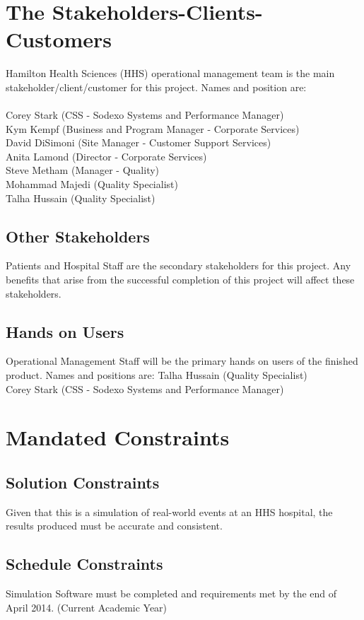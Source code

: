 \documentclass[paper=letter, fontsize=10pt]{scrartcl}
\numberwithin{equation}{section}		%
\numberwithin{figure}{section}			%
\numberwithin{table}{section}				%
\begin{document}
\section{The Stakeholders-Clients-Customers}
Hamilton Health Sciences (HHS) operational management team is the main stakeholder/client/customer for this project. Names and position are:\\ \\
Corey Stark (CSS - Sodexo Systems and Performance Manager)\\
Kym Kempf (Business and Program Manager - Corporate Services)\\
David DiSimoni (Site Manager - Customer Support Services)\\
Anita Lamond (Director - Corporate Services)\\
Steve Metham (Manager - Quality)\\
Mohammad Majedi (Quality Specialist)\\
Talha Hussain (Quality Specialist)

\subsection{Other Stakeholders}
Patients and Hospital Staff are the secondary stakeholders for this project. Any benefits that arise from the successful completion of this project will affect these stakeholders.
\subsection{Hands on Users}
Operational Management Staff will be the primary hands on users of the finished product. Names and positions are:
Talha Hussain (Quality Specialist)\\
Corey Stark (CSS - Sodexo Systems and Performance Manager)

\section{Mandated Constraints}
\subsection{Solution Constraints}
Given that this is a simulation of real-world events at an HHS hospital, the results produced must be accurate and consistent.
\subsection{Schedule Constraints}
Simulation Software must be completed and requirements met by the end of April 2014. (Current Academic Year)  
\end{document}

